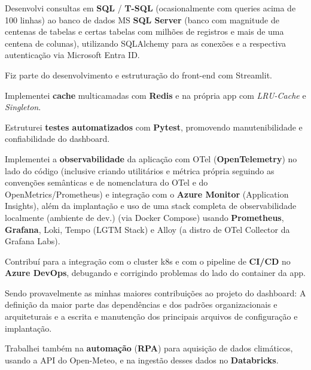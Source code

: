 \documentclass[portuguese,a4paper,nologo]{europasscv}
\begin{document}
\begin{europasscv}
{\begin{ecvitemize}
      \item Desenvolvi consultas em \textbf{SQL} / \textbf{T-SQL}
        (ocasionalmente com queries acima de 100 linhas)
        ao banco de dados MS \textbf{SQL Server}
        (banco com magnitude de centenas de tabelas e certas tabelas com milhões de registros e mais de uma centena de colunas),
        utilizando SQLAlchemy para as conexões e a respectiva autenticação via Microsoft Entra ID.

      \item Fiz parte do desenvolvimento e estruturação do front-end com Streamlit.

      \item Implementei \textbf{cache} multicamadas
        com \textbf{Redis} e na própria app com \textit{LRU-Cache} e \textit{Singleton}.

      \item Estruturei \textbf{testes automatizados} com \textbf{Pytest},
        promovendo manutenibilidade e confiabilidade do dashboard.

      \item Implementei a \textbf{observabilidade} da aplicação com OTel (\textbf{OpenTelemetry})
        no lado do código (inclusive criando utilitários e métrica própria
        seguindo as convenções semânticas e de nomenclatura do OTel e do OpenMetrics/Prometheus)
        e integração com o \textbf{Azure Monitor} (Application Insights),
        além da implantação e uso de uma stack completa de observabilidade localmente (ambiente de dev.)
        (via Docker Compose) usando \textbf{Prometheus}, \textbf{Grafana}, Loki, Tempo (LGTM Stack)
        e Alloy (a distro de OTel Collector da Grafana Labs).

      \item Contribuí para a integração com o cluster k8s e com o pipeline de \textbf{CI/CD} no \textbf{Azure DevOps},
        debugando e corrigindo problemas do lado do container da app.

      \item Sendo provavelmente as minhas maiores contribuições ao projeto do dashboard:
        A definição da maior parte das dependências e dos padrões organizacionais e arquiteturais
        e a escrita e manutenção dos principais arquivos de configuração e implantação.

      \item Trabalhei também na \textbf{automação} (\textbf{RPA}) para aquisição de dados climáticos,
        usando a API do Open-Meteo, e na ingestão desses dados no \textbf{Databricks}.


\end{ecvitemize}}
\end{europasscv}
\end{document}
